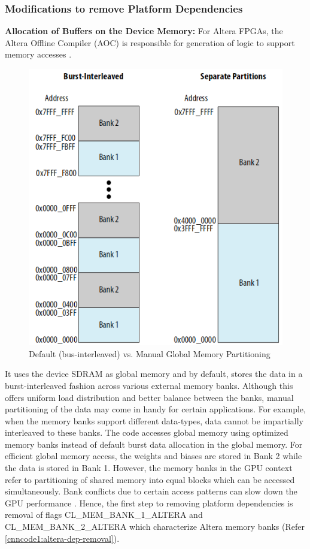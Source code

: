 \subsubsection{Modifications to remove Platform Dependencies}
\label{3_1_3_3}
\textbf{Allocation of Buffers on the Device Memory:}\newline
For Altera FPGAs, the Altera Offline Compiler (AOC) is responsible for generation of logic to support memory accesses \cite{alteraopencl}. 
\begin{figure}[h!]
 \centering
 \includegraphics[width=0.5\linewidth]{figures/global_mem_partitions.png}
 \caption{Default (bus-interleaved) vs. Manual Global Memory Partitioning
 \cite{alteraopencl}}
 \label{fig:global_mem_partitions}
\end{figure}
It uses the device SDRAM as global memory and by default, stores the data in a burst-interleaved fashion across various external memory banks. Although this offers uniform load distribution and better balance between the banks, manual partitioning of the data may come in handy for certain applications. For example, when the memory banks support different data-types, data cannot be impartially interleaved to these banks. \newline \newline
The code \cite{mnist-altera-opencl} accesses global memory using optimized memory banks instead of default burst data allocation in the global memory. 
For efficient global memory access, the weights and biases are stored in Bank 2 while the data is stored in Bank 1. However, the memory banks in the GPU context refer to partitioning of shared memory into equal blocks which can be accessed simultaneously. Bank conflicts due to certain access patterns can slow down the GPU performance \cite{gpu_mem_bank}. Hence, the first step to removing platform dependencies is removal of flags CL\_MEM\_BANK\_1\_ALTERA and CL\_MEM\_BANK\_2\_ALTERA which characterize Altera memory banks (Refer \ref{cnncode1:altera-dep-removal}).\newline \newline

